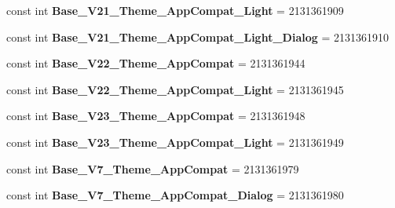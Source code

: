 \begin{DoxyCompactItemize}
const int {\bfseries Base\+\_\+\+V21\+\_\+\+Theme\+\_\+\+App\+Compat\+\_\+\+Light} = 2131361909
\item 
\mbox{\label{class_pinned_app_1_1_droid_1_1_resource_1_1_style_a0b132102bf77abfb3308cdec9cdef172}} 
const int {\bfseries Base\+\_\+\+V21\+\_\+\+Theme\+\_\+\+App\+Compat\+\_\+\+Light\+\_\+\+Dialog} = 2131361910
\item 
\mbox{\label{class_pinned_app_1_1_droid_1_1_resource_1_1_style_a50cac8e9a4bdd38d9a02d2f40005c249}} 
const int {\bfseries Base\+\_\+\+V22\+\_\+\+Theme\+\_\+\+App\+Compat} = 2131361944
\item 
\mbox{\label{class_pinned_app_1_1_droid_1_1_resource_1_1_style_a551a63f119f4943ef84b5baa91601bfe}} 
const int {\bfseries Base\+\_\+\+V22\+\_\+\+Theme\+\_\+\+App\+Compat\+\_\+\+Light} = 2131361945
\item 
\mbox{\label{class_pinned_app_1_1_droid_1_1_resource_1_1_style_a41527088bb828a9a36db3e6290c971ea}} 
const int {\bfseries Base\+\_\+\+V23\+\_\+\+Theme\+\_\+\+App\+Compat} = 2131361948
\item 
\mbox{\label{class_pinned_app_1_1_droid_1_1_resource_1_1_style_a822383915a65363656137dd233d48e49}} 
const int {\bfseries Base\+\_\+\+V23\+\_\+\+Theme\+\_\+\+App\+Compat\+\_\+\+Light} = 2131361949
\item 
\mbox{\label{class_pinned_app_1_1_droid_1_1_resource_1_1_style_ae0c650b314047c8add81961671dc1c79}} 
const int {\bfseries Base\+\_\+\+V7\+\_\+\+Theme\+\_\+\+App\+Compat} = 2131361979
\item 
\mbox{\label{class_pinned_app_1_1_droid_1_1_resource_1_1_style_a788f442a81123dad00f2b1c3324b2e1b}} 
const int {\bfseries Base\+\_\+\+V7\+\_\+\+Theme\+\_\+\+App\+Compat\+\_\+\+Dialog} = 2131361980
\item 
\mbox{\label{class_pinned_app_1_1_droid_1_1_resource_1_1_style_a1dd6706e844dcf0097c158188ee2dc76}} 

\end{DoxyCompactItemize}
